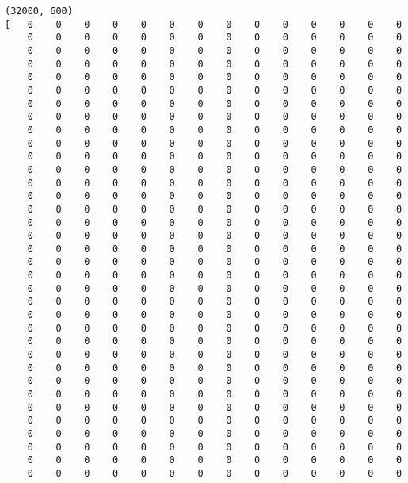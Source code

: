 \documentclass[11pt]{article}
\begin{document}
    \begin{Verbatim}[commandchars=\\\{\}]
(32000, 600)
[   0    0    0    0    0    0    0    0    0    0    0    0    0    0
    0    0    0    0    0    0    0    0    0    0    0    0    0    0
    0    0    0    0    0    0    0    0    0    0    0    0    0    0
    0    0    0    0    0    0    0    0    0    0    0    0    0    0
    0    0    0    0    0    0    0    0    0    0    0    0    0    0
    0    0    0    0    0    0    0    0    0    0    0    0    0    0
    0    0    0    0    0    0    0    0    0    0    0    0    0    0
    0    0    0    0    0    0    0    0    0    0    0    0    0    0
    0    0    0    0    0    0    0    0    0    0    0    0    0    0
    0    0    0    0    0    0    0    0    0    0    0    0    0    0
    0    0    0    0    0    0    0    0    0    0    0    0    0    0
    0    0    0    0    0    0    0    0    0    0    0    0    0    0
    0    0    0    0    0    0    0    0    0    0    0    0    0    0
    0    0    0    0    0    0    0    0    0    0    0    0    0    0
    0    0    0    0    0    0    0    0    0    0    0    0    0    0
    0    0    0    0    0    0    0    0    0    0    0    0    0    0
    0    0    0    0    0    0    0    0    0    0    0    0    0    0
    0    0    0    0    0    0    0    0    0    0    0    0    0    0
    0    0    0    0    0    0    0    0    0    0    0    0    0    0
    0    0    0    0    0    0    0    0    0    0    0    0    0    0
    0    0    0    0    0    0    0    0    0    0    0    0    0    0
    0    0    0    0    0    0    0    0    0    0    0    0    0    0
    0    0    0    0    0    0    0    0    0    0    0    0    0    0
    0    0    0    0    0    0    0    0    0    0    0    0    0    0
    0    0    0    0    0    0    0    0    0    0    0    0    0    0
    0    0    0    0    0    0    0    0    0    0    0    0    0    0
    0    0    0    0    0    0    0    0    0    0    0    0    0    0
    0    0    0    0    0    0    0    0    0    0    0    0    0    0
    0    0    0    0    0    0    0    0    0    0    0    0    0    0
    0    0    0    0    0    0    0    0    0    0    0    0    0    0
    0    0    0    0    0    0    0    0    0    0    0    0    0    0
    0    0    0    0    0    0    0    0    0    0    0    0    0    0
    0    0    0    0    0    0    0    0    0    0    0    0    0    0
    0    0    0    0    0    0    0    0    0    0    0    0    0    0
    0    0    0    0    0    0    0    0    0    0    0    0    0    0

\end{Verbatim}
\end{document}
